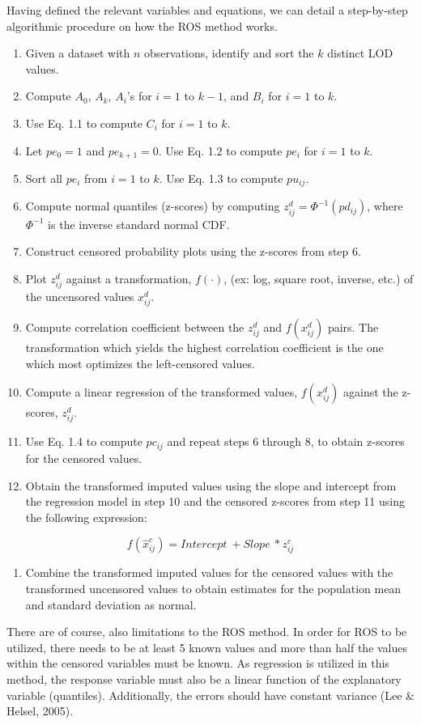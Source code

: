 \documentclass[12pt, twoside]{amherstthesis}
\providecommand{\tightlist}{%
  \setlength{\itemsep}{0pt}\setlength{\parskip}{0pt}}
\begin{document}
Having defined the relevant variables and equations, we can detail a step-by-step algorithmic procedure on how the ROS method works.
\begin{enumerate}
\def\labelenumi{\arabic{enumi}.}
\item
  Given a dataset with \(n\) observations, identify and sort the \(k\) distinct LOD values.
\item
  Compute \(A_0\), \(A_k\), \(A_i\)'s for \(i=1\) to \(k-1\), and \(B_i\) for \(i=1\) to \(k\).
\item
  Use Eq. 1.1 to compute \(C_i\) for \(i=1\) to \(k\).
\item
  Let \(pe_0 = 1\) and \(pe_{k+1} = 0\). Use Eq. 1.2 to compute \(pe_i\) for \(i=1\) to \(k\).
\item
  Sort all \(pe_i\) from \(i=1\) to \(k\). Use Eq. 1.3 to compute \(pu_{ij}\).
\item
  Compute normal quantiles (z-scores) by computing \(z_{ij}^{d} = \Phi^{-1}(pd_{ij})\), where \(\Phi^{-1}\) is the inverse standard normal CDF.
\item
  Construct censored probability plots using the z-scores from step 6.
\item
  Plot \(z_{ij}^{d}\) against a transformation, \(f(\cdot)\), (ex: log, square root, inverse, etc.) of the uncensored values \(x_{ij}^{d}\).
\item
  Compute correlation coefficient between the \(z_{ij}^{d}\) and \(f(x_{ij}^{d})\) pairs. The transformation which yields the highest correlation coefficient is the one which most optimizes the left-censored values.
\item
  Compute a linear regression of the transformed values, \(f(x_{ij}^{d})\) against the z-scores, \(z_{ij}^{d}\).
\item
  Use Eq. 1.4 to compute \(pc_{ij}\) and repeat steps 6 through 8, to obtain z-scores for the censored values.
\item
  Obtain the transformed imputed values using the slope and intercept from the regression model in step 10 and the censored z-scores from step 11 using the following expression:
\end{enumerate}
\[f(\hat{x}_{ij}^c) = {Intercept} \ + Slope \ * z_{ij}^{c}\]
\begin{enumerate}
\def\labelenumi{\arabic{enumi}.}
\setcounter{enumi}{12}
\tightlist
\item
  Combine the transformed imputed values for the censored values with the transformed uncensored values to obtain estimates for the population mean and standard deviation as normal.
\end{enumerate}
There are of course, also limitations to the ROS method. In order for ROS to be utilized, there needs to be at least 5 known values and more than half the values within the censored variables must be known. As regression is utilized in this method, the response variable must also be a linear function of the explanatory variable (quantiles). Additionally, the errors should have constant variance (Lee \& Helsel, 2005).
\end{document}
